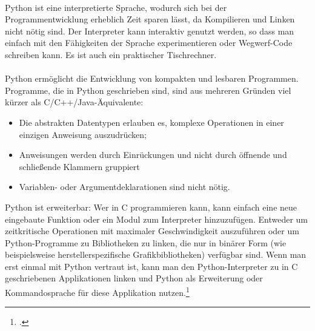 \\
Python ist eine interpretierte Sprache, wodurch sich bei der Programmentwicklung erheblich Zeit sparen lässt, da Kompilieren und Linken nicht nötig sind. Der Interpreter kann interaktiv genutzt werden, so dass man einfach mit den Fähigkeiten der Sprache experimentieren oder Wegwerf-Code schreiben kann. Es ist auch ein praktischer Tischrechner.\\
\\
Python ermöglicht die Entwicklung von kompakten und lesbaren Programmen. Programme, die in Python geschrieben sind, sind aus mehreren Gründen viel kürzer als C/C++/Java-Äquivalente:\\

\begin{itemize}
\item Die abstrakten Datentypen erlauben es, komplexe Operationen in einer einzigen Anweisung auszudrücken;
\item Anweisungen werden durch Einrückungen und nicht durch öffnende und schließende Klammern gruppiert
\item Variablen- oder Argumentdeklarationen sind nicht nötig.
\end{itemize}
Python ist erweiterbar: Wer in C programmieren kann, kann einfach eine neue eingebaute Funktion oder ein Modul zum Interpreter hinzuzufügen. Entweder um zeitkritische Operationen mit maximaler Geschwindigkeit auszuführen oder um Python-Programme zu Bibliotheken zu linken, die nur in binärer Form (wie beispielsweise herstellerspezifische Grafikbibliotheken) verfügbar sind. Wenn man erst einmal mit Python vertraut ist, kann man den Python-Interpreter zu in C geschriebenen Applikationen linken und Python als Erweiterung oder Kommandosprache für diese Applikation nutzen.\footcite{python_tutorial_appetite}

